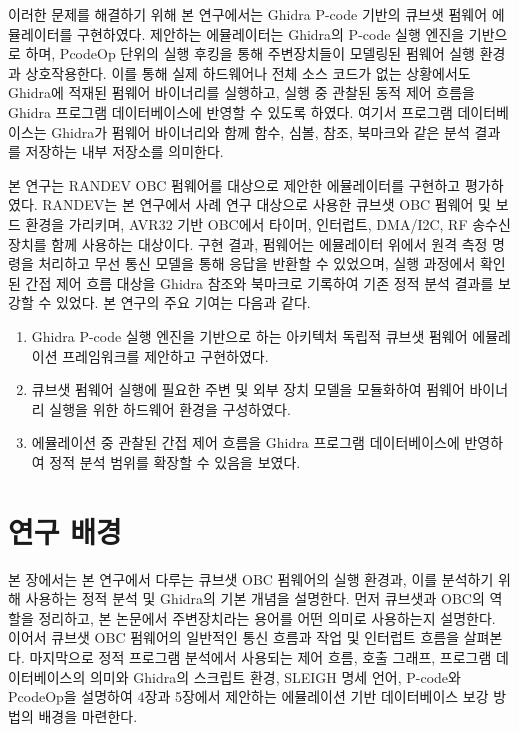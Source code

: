 \documentclass[master,korean,final]{kaist-ucs}
\begin{document}
이러한 문제를 해결하기 위해 본 연구에서는 Ghidra P-code 기반의 큐브샛 펌웨어 에뮬레이터를 구현하였다. 제안하는 에뮬레이터는 Ghidra의 P-code 실행 엔진을 기반으로 하며, PcodeOp 단위의 실행 후킹을 통해 주변장치들이 모델링된 펌웨어 실행 환경과 상호작용한다. 이를 통해 실제 하드웨어나 전체 소스 코드가 없는 상황에서도 Ghidra에 적재된 펌웨어 바이너리를 실행하고, 실행 중 관찰된 동적 제어 흐름을 Ghidra 프로그램 데이터베이스에 반영할 수 있도록 하였다. 여기서 프로그램 데이터베이스는 Ghidra가 펌웨어 바이너리와 함께 함수, 심볼, 참조, 북마크와 같은 분석 결과를 저장하는 내부 저장소를 의미한다.

본 연구는 RANDEV OBC 펌웨어를 대상으로 제안한 에뮬레이터를 구현하고 평가하였다. RANDEV는 본 연구에서 사례 연구 대상으로 사용한 큐브샛 OBC 펌웨어 및 보드 환경을 가리키며, AVR32 기반 OBC에서 타이머, 인터럽트, DMA/I2C, RF 송수신 장치를 함께 사용하는 대상이다. 구현 결과, 펌웨어는 에뮬레이터 위에서 원격 측정 명령을 처리하고 무선 통신 모델을 통해 응답을 반환할 수 있었으며, 실행 과정에서 확인된 간접 제어 흐름 대상을 Ghidra 참조와 북마크로 기록하여 기존 정적 분석 결과를 보강할 수 있었다. 본 연구의 주요 기여는 다음과 같다.

\begin{enumerate}
    \item Ghidra P-code 실행 엔진을 기반으로 하는 아키텍처 독립적 큐브샛 펌웨어 에뮬레이션 프레임워크를 제안하고 구현하였다.
    \item 큐브샛 펌웨어 실행에 필요한 주변 및 외부 장치 모델을 모듈화하여 펌웨어 바이너리 실행을 위한 하드웨어 환경을 구성하였다.
    \item 에뮬레이션 중 관찰된 간접 제어 흐름을 Ghidra 프로그램 데이터베이스에 반영하여 정적 분석 범위를 확장할 수 있음을 보였다.
\end{enumerate}

\chapter{연구 배경}

본 장에서는 본 연구에서 다루는 큐브샛 OBC 펌웨어의 실행 환경과, 이를 분석하기 위해 사용하는 정적 분석 및 Ghidra의 기본 개념을 설명한다. 먼저 큐브샛과 OBC의 역할을 정리하고, 본 논문에서 주변장치라는 용어를 어떤 의미로 사용하는지 설명한다. 이어서 큐브샛 OBC 펌웨어의 일반적인 통신 흐름과 작업 및 인터럽트 흐름을 살펴본다. 마지막으로 정적 프로그램 분석에서 사용되는 제어 흐름, 호출 그래프, 프로그램 데이터베이스의 의미와 Ghidra의 스크립트 환경, SLEIGH 명세 언어, P-code와 PcodeOp을 설명하여 4장과 5장에서 제안하는 에뮬레이션 기반 데이터베이스 보강 방법의 배경을 마련한다.
\end{document}
